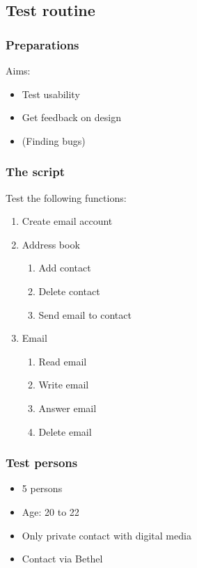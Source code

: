 \documentclass[9pt]{beamer}
\begin{document}
		\subsection{Test routine}
		
			\begin{frame}
				\frametitle{Preparations}
				Aims:
				\begin{itemize}
					\item Test usability
					\item Get feedback on design
					\item (Finding bugs)
				\end{itemize}
			\end{frame}
			
			\begin{frame}
				\frametitle{The script}
				Test the following functions:
				\begin{enumerate}
					\item Create email account
					\item Address book
					\begin{enumerate}
						\item Add contact
						\item Delete contact
						\item Send email to contact
					\end{enumerate}
					\item Email
					\begin{enumerate}
						\item Read email
						\item Write email
						\item Answer email
						\item Delete email
					\end{enumerate}
				\end{enumerate}
			\end{frame}
			
			\begin{frame}
				\frametitle{Test persons}
				\begin{itemize}
					\item 5 persons
					\item Age: 20 to 22
					\item Only private contact with digital media
					\item Contact via Bethel
				\end{itemize}
			\end{frame}
			
\end{document}
